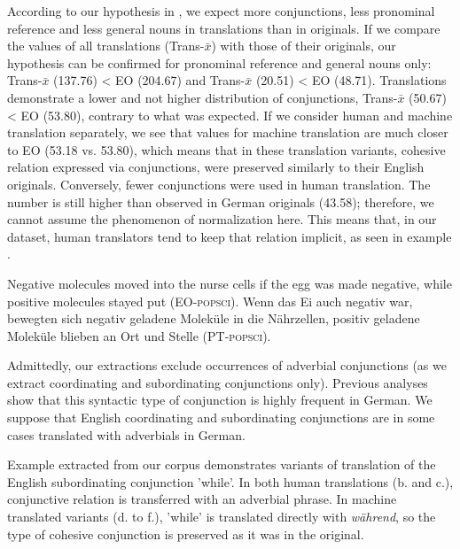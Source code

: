 \documentclass[output=paper]{LSP/langsci}
\begin{document}
According to our hypothesis in , we expect more conjunctions, less pronominal reference and less general nouns in translations than in originals. If we compare the values of all translations (Trans-$\bar{x}$) with those of their originals, our hypothesis can be confirmed for pronominal reference and general nouns only: Trans-$\bar{x}$ (137.76) < EO (204.67) and Trans-$\bar{x}$ (20.51) < EO (48.71). Translations demonstrate a lower and not higher distribution of conjunctions, Trans-$\bar{x}$ (50.67) < EO (53.80), contrary to what was expected. If we consider human and machine translation separately, we see that values for machine translation are much closer to EO (53.18 vs. 53.80), which means that in these translation variants, cohesive relation expressed via conjunctions, were preserved similarly to their English originals. Conversely, fewer conjunctions were used in human translation. The number is still higher than observed in German originals (43.58); therefore, we cannot assume the phenomenon of normalization here. This means that, in our dataset, human translators tend to keep that relation implicit, as seen in example .



\ea \label{ex:4:3}
\ea Negative molecules moved into the nurse cells if the egg was made negative, while positive molecules stayed put (EO-\textsc{popsci}).
\ex Wenn das Ei auch negativ war, bewegten sich negativ geladene Moleküle in die Nährzellen, positiv geladene Moleküle blieben an Ort und Stelle (PT-\textsc{popsci}).
\z
\z

Admittedly, our extractions exclude occurrences of adverbial conjunctions (as we extract coordinating and subordinating conjunctions only). Previous analyses \citep[e.g.][]{KunzLapshinova2014} show that this syntactic type of conjunction is highly frequent in German. We suppose that English coordinating and subordinating conjunctions are in some cases translated with adverbials in German. 

Example  extracted from our corpus demonstrates variants of translation of the English subordinating conjunction 'while'. In both human translations (b. and c.), conjunctive relation is transferred with an adverbial phrase. In machine translated variants (d. to f.), 'while' is translated directly with \textit{während}, so the type of cohesive conjunction is preserved as it was in the original.
\end{document}
